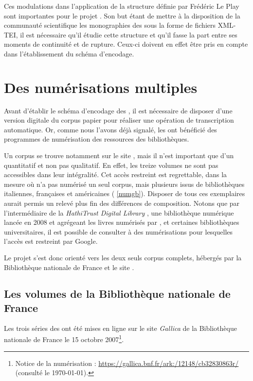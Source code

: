 Ces modulations dans l'application de la structure définie par Frédéric Le Play sont importantes pour le projet \timeus. Son but étant de mettre à la disposition de la communauté scientifique les monographies des \odm{} sous la forme de fichiers XML-TEI, il est nécessaire qu'il étudie cette structure et qu'il fasse la part entre ses moments de continuité et de rupture. Ceux-ci doivent en effet être pris en compte dans l'établissement du schéma d'encodage.

\newpage
\thispagestyle{empty}
\mbox{}
\newpage

\chapter{Des numérisations multiples}

Avant d'établir le schéma d'encodage des \odm, il est nécessaire de disposer d'une version digitale du corpus \og papier \fg{} pour réaliser une opération de transcription automatique. Or, comme nous l'avons déjà signalé, les \odm{} ont bénéficié des programmes de numérisation des ressources des bibliothèques.

Un corpus se trouve notamment sur le site \gb, mais il n'est important que d'un \pov{} quantitatif et non pas qualitatif. En effet, les treize volumes ne sont pas accessibles dans leur intégralité. Cet accès restreint est regrettable, dans la mesure où \gb{} n'a pas numérisé un seul corpus, mais plusieurs issus de bibliothèques italiennes, françaises et américaines (\ann{} \ref{numgb}). Disposer de tous ces exemplaires aurait permis un relevé plus fin des différences de composition. Notons que par l'intermédiaire de la \textit{HathiTrust Digital Library }, une bibliothèque numérique lancée en 2008 et agrégeant les livres numérisés par \gb, \ia{} et certaines bibliothèques universitaires, il est possible de consulter à des numérisations pour lesquelles l'accès est restreint par Google.

Le projet \timeus{} s'est donc orienté vers les deux seuls corpus complets, hébergés par la Bibliothèque nationale de France et le site \ia.

\section{Les volumes de la Bibliothèque nationale de France}

Les trois séries des \odm{} ont été mises en ligne sur le site \textit{Gallica} de la Bibliothèque nationale de France le 15 octobre 2007\footnote{Notice de la numérisation : \url{https://gallica.bnf.fr/ark:/12148/cb32830863r/} (consulté le \today).}.

